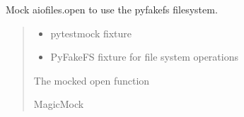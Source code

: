 \documentclass[letterpaper,10pt,openany,oneside,english]{sphinxmanual}
\begin{document}
\begin{savenotes}\begin{fulllineitems}
\label{\detokenize{modules/tests:storeapi.tests.routers.test_upload.aiofiles_mock_open}}
\pysigstartsignatures
{}
\pysigstopsignatures
\sphinxAtStartPar
Mock aiofiles.open to use the pyfakefs filesystem.
\begin{quote}\begin{description}
\begin{itemize}
\item {} 
\sphinxAtStartPar
{} \textendash{} pytest\sphinxhyphen{}mock fixture

\item {} 
\sphinxAtStartPar
{} \textendash{} PyFakeFS fixture for file system operations

\end{itemize}

\sphinxAtStartPar
The mocked open function

\sphinxAtStartPar
MagicMock

\end{description}\end{quote}

\end{fulllineitems}\end{savenotes}

\end{document}
